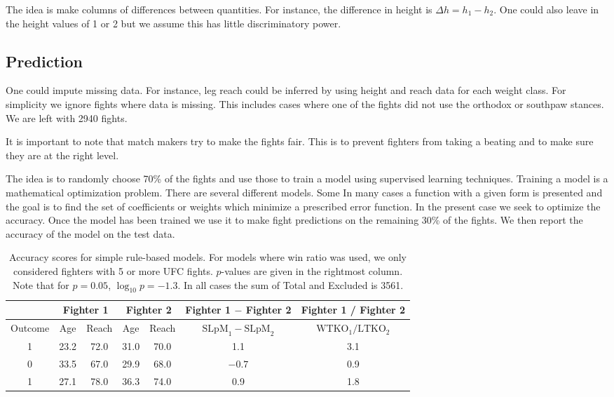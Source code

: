 The idea is make columns of differences between
quantities. For instance, the difference in
height is $\Delta h = h_1 - h_2$. One could also leave
in the height values of 1 or 2 but we assume this has
little discriminatory power.

\subsection*{Prediction}

One could impute missing data. For instance, leg reach
could be inferred by using height and reach data for
each weight class. For simplicity we ignore fights
where data is missing. This includes cases where one
of the fights did not use the orthodox or southpaw
stances. We are left with 2940 fights.

It is important to note that match makers try to make
the fights fair. This is to prevent fighters from taking
a beating and to make sure they are at the right level.

The idea is to randomly choose 70\% of the fights and
use those to train a model using supervised
learning techniques.
Training a model is a mathematical optimization problem.
There are several different models. Some 
In many cases a function with a given form is presented
and the goal is to find the set of coefficients or weights
which minimize a prescribed error function. In the present
case we seek to optimize the accuracy.
Once the model has been
trained we use it to make fight predictions on
the remaining 30\% of the fights. We then report the
accuracy of the model on the test data.

\begin{center}
\begin{table}[h]
\begin{tabular}{c|cccccc}
  \toprule
  {} &  \multicolumn{2}{c}{{Fighter 1}} & \multicolumn{2}{c}{{Fighter 2}} & Fighter 1 $-$ Fighter 2 & Fighter 1 / Fighter 2\\
  \hline
  Outcome & Age & Reach & Age & Reach & $\textrm{SLpM}_1 - \textrm{SLpM}_2$ & $\textrm{WTKO}_1/\textrm{LTKO}_2$\\
  \hline
  1 & 23.2 & 72.0 & 31.0 & 70.0 & 1.1 & 3.1\\
  0 & 33.5 & 67.0 & 29.9 & 68.0 & $-0.7$ & 0.9\\
  1 & 27.1 & 78.0 & 36.3 & 74.0 & 0.9 & 1.8\\
  \bottomrule
\end{tabular}
\caption{Accuracy scores for simple rule-based models. For models where win ratio was used, we only considered
fighters with 5 or more UFC fights. $p$-values are given in the rightmost column. Note that for $p=0.05$, $\log_{10}p = -1.3$. In all
cases the sum of
Total and Excluded is 3561.}
\label{sample_labels_features}
\end{table}
\end{center}


